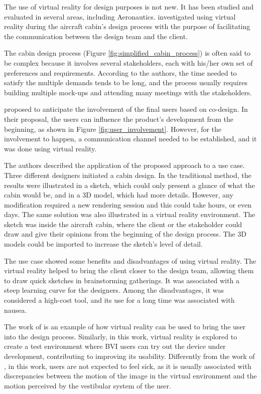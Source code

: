 
The use of virtual reality for design purposes is not new. It has been studied and evaluated in several areas, including Aeronautics.  investigated using virtual reality during the aircraft cabin’s design process with the purpose of facilitating the communication between the design team and the client. 

The cabin design process (Figure \ref{fig:simplified_cabin_process}) is often said to be complex because it involves several stakeholders, each with his/her own set of preferences and requirements. According to the authors, the time needed to satisfy the multiple demands tends to be long, and the process usually requires building multiple mock-ups and attending many meetings with the stakeholders. 



 proposed to anticipate the involvement of the final users based on co-design. In their proposal, the users can influence the product's development from the beginning, as shown in Figure \ref{fig:user_involvement}. However, for the involvement to happen, a communication channel needed to be established, and it was done using virtual reality.



The authors described the application of the proposed approach to a use case. Three different designers initiated a cabin design. In the traditional method, the results were illustrated in a sketch, which could only present a glance of what the cabin would be, and in a 3D model, which had more details. However, any modification required a new rendering session and this could take hours, or even days. The same solution was also illustrated in a virtual reality environment. The sketch was inside the aircraft cabin, where the client or the stakeholder could draw and give their opinions from the beginning of the design process. The 3D models could be imported to increase the sketch's level of detail.

The use case showed some benefits and disadvantages of using virtual reality. The virtual reality helped to bring the client closer to the design team, allowing them to draw quick sketches in brainstorming gatherings. It was associated with a steep learning curve for the designers. Among the disadvantages, it was considered a high-cost tool, and its use for a long time was associated with nausea. 

The work of  is an example of how virtual reality can be used to bring the user into the design process. Similarly, in this work, virtual reality is explored to create a test environment where BVI users can try out the device under development, contributing to improving its usability. Differently from the work of , in this work, users are not expected to feel sick, as it is usually associated with discrepancies between the motion of the image in the virtual environment and the motion perceived by the vestibular system of the user.